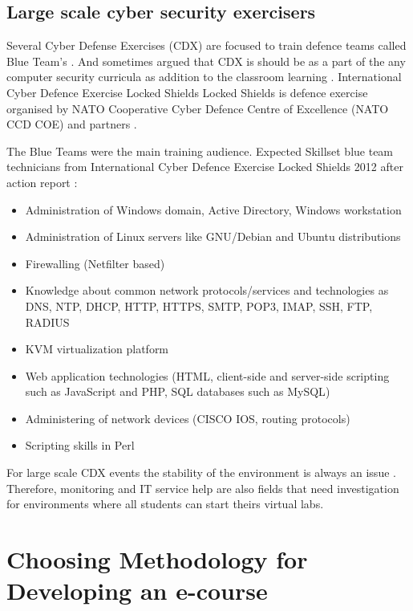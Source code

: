 \subsection{Large scale cyber security exercisers}
Several Cyber Defense Exercises (\gls{CDX}) are focused to train defence teams called Blue Team's \citep{website:NATO_CCD_COE,schepens_CDX}. And sometimes argued that \gls{CDX} is should be as a part of the any computer security curricula as addition to the classroom learning \citep{adams_CDX_curricula}. International Cyber Defence Exercise Locked Shields Locked Shields is defence exercise organised by NATO Cooperative Cyber Defence Centre of Excellence (\gls{NATO CCD COE}) and partners  \citep{website:NATO_CCD_COE}. 

The Blue Teams were the main training audience.
Expected Skillset blue team technicians from International Cyber Defence Exercise Locked Shields 2012 after action report \citep{website:NATO_CCD_COE}:
\begin{itemize}
\item Administration of Windows domain, Active Directory, Windows workstation
\item Administration of Linux servers like GNU/Debian and Ubuntu distributions
\item Firewalling (Netfilter based)
\item Knowledge about common network protocols/services and technologies as \gls{DNS}, \gls{NTP}, \gls{DHCP}, \gls{HTTP}, \gls{HTTPS}, \gls{SMTP}, \gls{POP3}, \gls{IMAP}, \gls{SSH}, \gls{FTP}, \gls{RADIUS}
\item \gls{KVM} virtualization platform
\item Web application technologies (\gls{HTML}, client-side and server-side scripting
such as JavaScript and \gls{PHP}, \gls{SQL} databases such as \gls{MySQL})
\item Administering of network devices (CISCO IOS, routing protocols)
\item Scripting skills in Perl
\end{itemize}

For large scale \gls{CDX} events the stability of the environment is always an issue \citep{website:NATO_CCD_COE,schepens_CDX}. Therefore, monitoring and IT service help are also fields that need investigation for environments where all students can start theirs virtual labs.

\section{Choosing Methodology for Developing an e-course}

